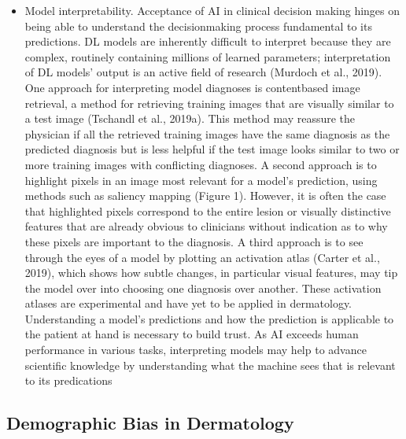 \documentclass[12pt, a4paper, oneside]{book}   	%
\begin{document}
\begin{itemize}
				\item Model interpretability. Acceptance of AI in clinical decision making hinges on being able to understand the decisionmaking process fundamental to its predictions. DL models are inherently difficult to interpret because they are complex, routinely containing millions of learned parameters; interpretation of DL models’ output is an active field of research (Murdoch et al., 2019). One approach for interpreting model diagnoses is contentbased image retrieval, a method for retrieving training images that are visually similar to a test image (Tschandl et al., 2019a). This method may reassure the physician if all the retrieved training images have the same diagnosis as the predicted diagnosis but is less helpful if the test image looks similar to two or more training images with conflicting diagnoses. A second approach is to highlight pixels in an image most relevant for a model’s prediction, using methods such as saliency mapping (Figure 1). However, it is often the case that highlighted pixels correspond to the entire lesion or visually distinctive features that are already obvious to clinicians without indication as to why these pixels are important to the diagnosis. A third approach is to see through the eyes of a model by plotting an activation atlas (Carter et al., 2019), which shows how subtle changes, in particular visual features, may tip the model over into choosing one diagnosis over another. These activation atlases are experimental and have yet to be applied in dermatology. Understanding a model’s predictions and how the prediction is applicable to the patient at hand is necessary to build trust. As AI exceeds human performance in various tasks, interpreting models may help to advance scientific knowledge by understanding what the machine sees that is relevant to its predications \autocite{Young_2020}
			\end{itemize}
		\subsection{Demographic Bias in Dermatology}
\end{document}
